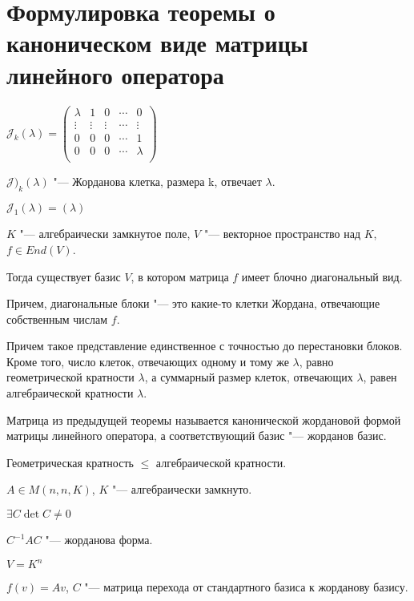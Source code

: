 \section{Формулировка теоремы о каноническом виде матрицы линейного оператора}
\begin{Def}
$\mathcal{J}_k(\lambda) = \begin{pmatrix}
\lambda&1&0&\cdots&0\\
\vdots&\vdots&\vdots&\cdots&\vdots\\
0&0&0&\cdots&1\\
0&0&0&\cdots&\lambda\\
\end{pmatrix}$

$\mathcal{J})_k(\lambda)$ "--- Жорданова клетка, размера k, отвечает $\lambda$.

$\mathcal{J}_1(\lambda) = (\lambda)$
\end{Def}

\begin{theorem}{}
$K$ "--- алгебраически замкнутое поле, $V$ "--- векторное пространство над $K$, 
$f \in End(V)$.

Тогда существует базис $V$, в котором матрица $f$ имеет блочно диагональный вид.

Причем, диагональные блоки "--- это какие-то клетки Жордана, отвечающие собственным 
числам $f$.

Причем такое представление единственное с точностью до перестановки блоков.
Кроме того, число клеток, отвечающих одному и тому же $\lambda$, равно геометрической
кратности $\lambda$, а суммарный размер клеток, отвечающих $\lambda$, равен
алгебраической кратности $\lambda$. 
\end{theorem}

\begin{Def}
Матрица из предыдущей теоремы называется канонической жордановой формой
матрицы линейного оператора, а соответствующий базис "--- жорданов базис.
\end{Def}
\begin{conseq}
Геометрическая кратность $\le$ алгебраической кратности.
\end{conseq}

\begin{conseq}
$A \in M(n, n, K)$, $K$ "--- алгебраически замкнуто.

$\exists C \det C \ne 0$

$C^{-1}AC$ "--- жорданова форма.

$V = K^{n}$

$f(v) = Av$, $C$ "--- матрица перехода от стандартного базиса к жорданову базису.
\end{conseq}

